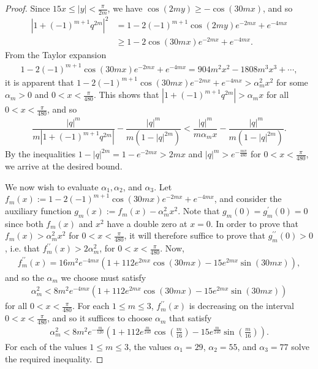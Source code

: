\documentclass[11pt,reqno]{amsart}
\theoremstyle{definition}
\theoremstyle{plain}
\theoremstyle{named}
\numberwithin{equation}{section}
\theoremstyle{example}
\def\lp{\left(}
\def\rp{\right)}
\begin{document}
\begin{proof}
Since $15x \leq |y| < \frac{\pi}{2m}$, we have $\cos\lp 2my \rp \geq - \cos\lp 30mx \rp$, and so
\begin{align*}
    \left| 1 + \lp -1 \rp^{m+1} q^{2m} \right|^2 &= 1 - 2 \lp -1 \rp^{m+1} \cos\lp 2my \rp e^{-2mx} + e^{-4mx} \\ &\geq 1 - 2 \cos\lp 30mx \rp e^{-2mx} + e^{-4mx}.
\end{align*}
From the Taylor expansion
\begin{align*}
    1 - 2 \lp -1 \rp^{m+1} \cos\lp 30mx \rp e^{-2mx} + e^{-4mx} = 904 m^2 x^2 - 1808 m^3 x^3 + \cdots,
\end{align*}
it is apparent that $1 - 2 \lp -1 \rp^{m+1} \cos\lp 30mx \rp e^{-2mx} + e^{-4mx} > \alpha_m^2 x^2$ for some $\alpha_m > 0$ and $0 < x < \frac{\pi}{480}$. This shows that $\left| 1 + \lp -1 \rp^{m+1} q^{2m} \right| > \alpha_m x$ for all $0 < x < \frac{\pi}{480}$, and so
\begin{align*}
    \dfrac{|q|^m}{m\left| 1 + \lp -1 \rp^{m+1} q^{2m} \right|} - \dfrac{|q|^m}{m\lp 1 - |q|^{2m} \rp} < \dfrac{|q|^m}{m \alpha_m x} - \dfrac{|q|^m}{m\lp 1 - |q|^{2m} \rp}.
\end{align*}
By the inequalities $1 - |q|^{2m} = 1 - e^{-2mx} > 2mx$ and $|q|^m > e^{- \frac{m\pi}{480}}$ for $0 < x < \frac{\pi}{480}$, we arrive at the desired bound.

We now wish to evaluate $\alpha_1, \alpha_2$, and $\alpha_3$. Let $f_m(x) := 1 - 2 \lp -1 \rp^{m+1} \cos\lp 30mx \rp e^{-2mx} + e^{-4mx}$, and consider the auxiliary function $g_m(x) := f_m(x) - \alpha_m^2 x^2$. Note that $g_m(0) = g_m^\prime(0) = 0$ since both $f_m(x)$ and $x^2$ have a double zero at $x=0$. In order to prove that $f_m(x) > \alpha_m^2 x^2$ for $0 < x < \frac{\pi}{480}$, it will therefore suffice to prove that $g_m^{\prime\prime}(0) > 0$, i.e. that $f_m^{\prime\prime}(x) > 2 \alpha_m^2$, for $0 < x < \frac{\pi}{480}$. Now,
\begin{align*}
    f^{\prime\prime}_m(x) = 16 m^2 e^{-4 m x} \lp 1 + 112 e^{2 m x} \cos\lp 30 m x \rp - 15 e^{2 m x} \sin\lp 30 m x \rp \rp,
\end{align*}
and so the $\alpha_m$ we choose must satisfy
\begin{align*}
    \alpha_m^2 < 8 m^2 e^{-4 m x} \lp 1 + 112 e^{2 m x} \cos\lp 30 m x \rp - 15 e^{2 m x} \sin\lp 30 m x \rp \rp
\end{align*}
for all $0 < x < \frac{\pi}{480}$. For each $1 \leq m \leq 3$, $f^{\prime\prime}_m(x)$ is decreasing on the interval $0 < x < \frac{\pi}{480}$, and so it suffices to choose $\alpha_m$ that satisfy
\begin{align*}
    \alpha_m^2 < 8 m^2 e^{- \frac{m}{120}} \lp 1 + 112 e^{\frac{m}{240}} \cos\lp \frac{m}{16} \rp - 15 e^{\frac{m}{240}} \sin\lp \frac{m}{16} \rp \rp.
\end{align*}
For each of the values $1 \leq m \leq 3$, the values $\alpha_1 = 29$, $\alpha_2 = 55$, and $\alpha_3 = 77$ solve the required inequality.
\end{proof}
\end{document}
